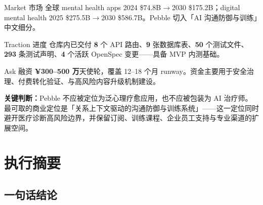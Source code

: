 \documentclass[UTF8,11pt,a4paper]{ctexart}
\newcommand{\fact}[1]{\textcolor{PebbleRock}{\textbf{#1}}}
\newcommand{\assumption}[1]{\textcolor{PebbleClay}{\textbf{#1}}}
\begin{document}
\noindent
\begin{minipage}[t]{0.31\textwidth}
\begin{snapshotcell}{Market 市场}
全球 mental health apps 2024 \$74.8B$\to$2030 \$175.2B；digital mental health 2025 \$275.5B$\to$2030 \$586.7B。Pebble 切入「AI 沟通防御与训练」中文细分。
\end{snapshotcell}
\end{minipage}\hfill
\begin{minipage}[t]{0.31\textwidth}
\begin{snapshotcell}{Traction 进度}
仓库内已交付 \fact{8} 个 API 路由、\fact{9} 张数据库表、\fact{50} 个测试文件、\fact{293} 条测试声明、\fact{4} 个活跃 OpenSpec 变更——具备 MVP 内测基础。
\end{snapshotcell}
\end{minipage}\hfill
\begin{minipage}[t]{0.31\textwidth}
\begin{snapshotcell}{Ask 融资}
\assumption{¥300--500 万}天使轮，覆盖 12--18 个月 runway。资金主要用于安全治理、付费转化验证、与高风险内容升级机制建设。
\end{snapshotcell}
\end{minipage}

\vspace{6mm}
\begin{keyfinding}
\textbf{关键判断：}Pebble 不应被定位为泛心理疗愈应用，也不应被包装为 AI 治疗师。最可取的商业定位是「关系上下文驱动的沟通防御与训练系统」——这一定位同时避开医疗诊断高风险边界，并保留订阅、训练课程、企业员工支持与专业渠道的扩展空间。
\end{keyfinding}

\clearpage

\thispagestyle{plain}
\tableofcontents
\clearpage

\section{执行摘要}

\subsection{一句话结论}
\end{document}
